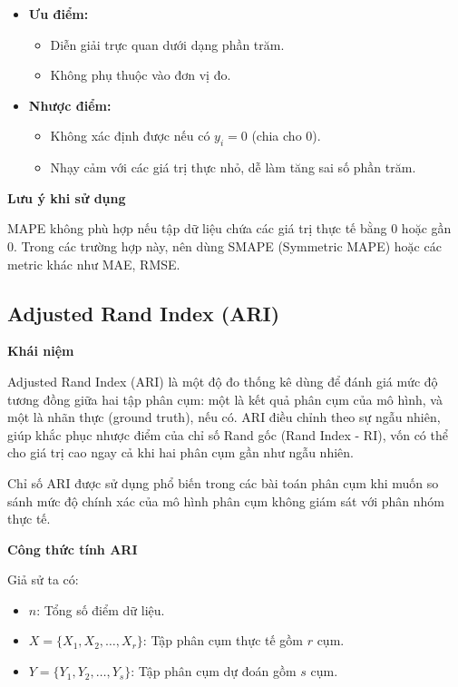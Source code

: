 \begin{itemize}
    \item \textbf{Ưu điểm:}
        \begin{itemize}
            \item Diễn giải trực quan dưới dạng phần trăm.
            \item Không phụ thuộc vào đơn vị đo.
        \end{itemize}
    \item \textbf{Nhược điểm:}
        \begin{itemize}
            \item Không xác định được nếu có $y_i = 0$ (chia cho 0).
            \item Nhạy cảm với các giá trị thực nhỏ, dễ làm tăng sai số phần trăm.
        \end{itemize}
\end{itemize}

\textbf{Lưu ý khi sử dụng}

MAPE không phù hợp nếu tập dữ liệu chứa các giá trị thực tế bằng 0 hoặc gần 0. Trong các trường hợp này, nên dùng SMAPE (Symmetric MAPE) hoặc các metric khác như MAE, RMSE.

\subsection{Adjusted Rand Index (ARI)}
\textbf{Khái niệm}

Adjusted Rand Index (ARI) là một độ đo thống kê dùng để đánh giá mức độ tương đồng giữa hai tập phân cụm: một là kết quả phân cụm của mô hình, và một là nhãn thực (ground truth), nếu có. ARI điều chỉnh theo sự ngẫu nhiên, giúp khắc phục nhược điểm của chỉ số Rand gốc (Rand Index - RI), vốn có thể cho giá trị cao ngay cả khi hai phân cụm gần như ngẫu nhiên.

Chỉ số ARI được sử dụng phổ biến trong các bài toán phân cụm khi muốn so sánh mức độ chính xác của mô hình phân cụm không giám sát với phân nhóm thực tế.

\textbf{Công thức tính ARI}

Giả sử ta có:
\begin{itemize}
    \item $n$: Tổng số điểm dữ liệu.
    \item $X = \{X_1, X_2, \ldots, X_r\}$: Tập phân cụm thực tế gồm $r$ cụm.
    \item $Y = \{Y_1, Y_2, \ldots, Y_s\}$: Tập phân cụm dự đoán gồm $s$ cụm.
\end{itemize}

